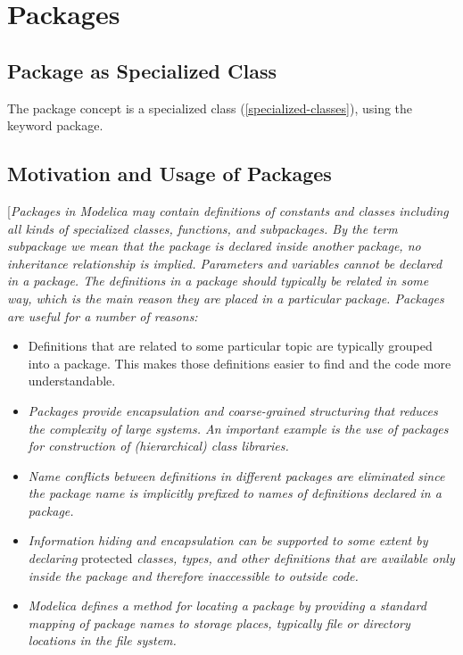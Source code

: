 \chapter{Packages}

\section{Package as Specialized Class}

The package concept is a specialized class (\ref{specialized-classes}), using the
keyword package.

\section{Motivation and Usage of Packages}

{[}\emph{Packages in Modelica may contain definitions of constants and
classes including all kinds of specialized classes, functions, and
subpackages. By the term subpackage we mean that the package is declared
inside another package, no inheritance relationship is implied.
Parameters and variables cannot be declared in a package. The
definitions in a package should typically be related in some way, which
is the main reason they are placed in a particular package. Packages are
useful for a number of reasons:}

\begin{itemize}
\item
  Definitions that are related to some particular topic are typically
  grouped into a package. This makes those definitions easier to find
  and the code more understandable.
\item
  \emph{Packages provide encapsulation and coarse-grained structuring
  that reduces the complexity of large systems. An important example is
  the use of packages for construction of (hierarchical) class
  libraries.}
\item
  \emph{Name conflicts between definitions in different packages are
  eliminated since the package name is implicitly prefixed to names of
  definitions declared in a package.}
\item
  \emph{Information hiding and encapsulation can be supported to some
  extent by declaring} protected \emph{classes, types, and other
  definitions that are available only inside the package and therefore
  inaccessible to outside code.}
\item
  \emph{Modelica defines a method for locating a package by providing a
  standard mapping of package names to storage places, typically file or
  directory locations in the file system. }
\end{itemize}


